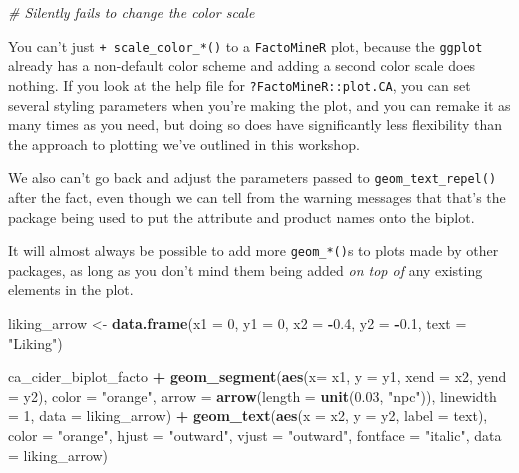 \documentclass[
]{book}
\newenvironment{Shaded}{\begin{snugshade}}{\end{snugshade}}
\newcommand{\AttributeTok}[1]{\textcolor[rgb]{0.13,0.29,0.53}{#1}}
\newcommand{\CommentTok}[1]{\textcolor[rgb]{0.56,0.35,0.01}{\textit{#1}}}
\newcommand{\DecValTok}[1]{\textcolor[rgb]{0.00,0.00,0.81}{#1}}
\newcommand{\FloatTok}[1]{\textcolor[rgb]{0.00,0.00,0.81}{#1}}
\newcommand{\FunctionTok}[1]{\textcolor[rgb]{0.13,0.29,0.53}{\textbf{#1}}}
\newcommand{\NormalTok}[1]{#1}
\newcommand{\OtherTok}[1]{\textcolor[rgb]{0.56,0.35,0.01}{#1}}
\newcommand{\SpecialCharTok}[1]{\textcolor[rgb]{0.81,0.36,0.00}{\textbf{#1}}}
\newcommand{\StringTok}[1]{\textcolor[rgb]{0.31,0.60,0.02}{#1}}
\begin{document}
\begin{Shaded}
\begin{Highlighting}[]
  \CommentTok{\# Silently fails to change the color scale}
\end{Highlighting}
\end{Shaded}

You can't just \texttt{+\ scale\_color\_*()} to a \texttt{FactoMineR} plot, because the \texttt{ggplot} already has a non-default color scheme and adding a second color scale does nothing. If you look at the help file for \texttt{?FactoMineR::plot.CA}, you can set several styling parameters when you're making the plot, and you can remake it as many times as you need, but doing so does have significantly less flexibility than the approach to plotting we've outlined in this workshop.

We also can't go back and adjust the parameters passed to \texttt{geom\_text\_repel()} after the fact, even though we can tell from the warning messages that that's the package being used to put the attribute and product names onto the biplot.

It will almost always be possible to add more \texttt{geom\_*()}s to plots made by other packages, as long as you don't mind them being added \emph{on top of} any existing elements in the plot.

\begin{Shaded}
\begin{Highlighting}[]
\NormalTok{liking\_arrow }\OtherTok{\textless{}{-}} \FunctionTok{data.frame}\NormalTok{(}\AttributeTok{x1 =} \DecValTok{0}\NormalTok{, }\AttributeTok{y1 =} \DecValTok{0}\NormalTok{, }\AttributeTok{x2 =} \SpecialCharTok{{-}}\FloatTok{0.4}\NormalTok{, }\AttributeTok{y2 =} \SpecialCharTok{{-}}\FloatTok{0.1}\NormalTok{, }\AttributeTok{text =} \StringTok{"Liking"}\NormalTok{)}

\NormalTok{ca\_cider\_biplot\_facto }\SpecialCharTok{+}
  \FunctionTok{geom\_segment}\NormalTok{(}\FunctionTok{aes}\NormalTok{(}\AttributeTok{x=}\NormalTok{ x1, }\AttributeTok{y =}\NormalTok{ y1, }\AttributeTok{xend =}\NormalTok{ x2, }\AttributeTok{yend =}\NormalTok{ y2), }\AttributeTok{color =} \StringTok{"orange"}\NormalTok{,}
               \AttributeTok{arrow =} \FunctionTok{arrow}\NormalTok{(}\AttributeTok{length =} \FunctionTok{unit}\NormalTok{(}\FloatTok{0.03}\NormalTok{, }\StringTok{"npc"}\NormalTok{)), }\AttributeTok{linewidth =} \DecValTok{1}\NormalTok{,}
               \AttributeTok{data =}\NormalTok{ liking\_arrow) }\SpecialCharTok{+}
  \FunctionTok{geom\_text}\NormalTok{(}\FunctionTok{aes}\NormalTok{(}\AttributeTok{x =}\NormalTok{ x2, }\AttributeTok{y =}\NormalTok{ y2, }\AttributeTok{label =}\NormalTok{ text), }\AttributeTok{color =} \StringTok{"orange"}\NormalTok{,}
            \AttributeTok{hjust =} \StringTok{"outward"}\NormalTok{, }\AttributeTok{vjust =} \StringTok{"outward"}\NormalTok{, }\AttributeTok{fontface =} \StringTok{"italic"}\NormalTok{,}
            \AttributeTok{data =}\NormalTok{ liking\_arrow)}
\end{Highlighting}
\end{Shaded}
\end{document}
